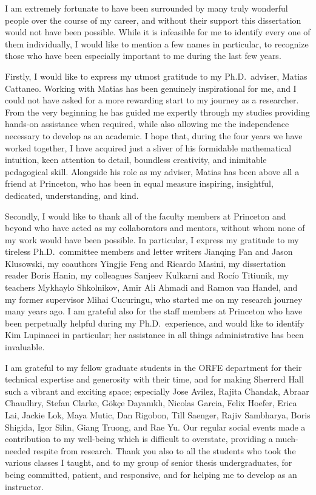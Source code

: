 
I am extremely fortunate to have been surrounded by many truly wonderful people
over the course of my career, and without their support this dissertation would
not have been possible. While it is infeasible for me to identify every one of
them individually, I would like to mention a few names in particular, to
recognize those who have been especially important to me during the last few
years.

Firstly, I would like to express my utmost gratitude to my Ph.D.\ adviser,
Matias Cattaneo. Working with Matias has been genuinely inspirational for me,
and I could not have asked for a more rewarding start to my journey as a
researcher. From the very beginning he has guided me expertly through my
studies providing hands-on assistance when required, while also allowing me the
independence necessary to develop as an academic. I hope that, during the four
years we have worked together, I have acquired just a sliver of his formidable
mathematical intuition, keen attention to detail, boundless creativity, and
inimitable pedagogical skill. Alongside his role as my adviser, Matias has been
above all a friend at Princeton, who has been in equal measure inspiring,
insightful, dedicated, understanding, and kind.

Secondly, I would like to thank all of the faculty members at Princeton and
beyond who have acted as my collaborators and mentors, without whom none of my
work would have been possible. In particular, I express my gratitude to my
tireless Ph.D.\ committee members and letter writers Jianqing Fan and Jason
Klusowski, my coauthors Yingjie Feng and Ricardo Masini, my dissertation reader
Boris Hanin, my colleagues Sanjeev Kulkarni and Roc{\'i}o Titiunik, my teachers
Mykhaylo Shkolnikov, Amir Ali Ahmadi and Ramon van Handel, and my former
supervisor Mihai Cucuringu, who started me on my research journey many years
ago. I am grateful also for the staff members at Princeton who have been
perpetually helpful during my Ph.D.\ experience, and would like to identify Kim
Lupinacci in particular; her assistance in all things administrative has been
invaluable.

I am grateful to my fellow graduate students in the ORFE department for their
technical expertise and generosity with their time, and for making Sherrerd
Hall such a vibrant and exciting space; especially Jose Avilez, Rajita Chandak,
Abraar Chaudhry, Stefan Clarke, G{\"o}k{\c c}e Dayan{\i}kl{\i}, Nicolas Garcia,
Felix Hoefer, Erica Lai, Jackie Lok, Maya Mutic, Dan Rigobon, Till Saenger,
Rajiv Sambharya, Boris Shigida, Igor Silin, Giang Truong, and Rae Yu. Our
regular social events made a contribution to my well-being which is difficult
to overstate, providing a much-needed respite from research. Thank you also to
all the students who took the various classes I taught, and to my group of
senior thesis undergraduates, for being committed, patient, and responsive, and
for helping me to develop as an instructor.


